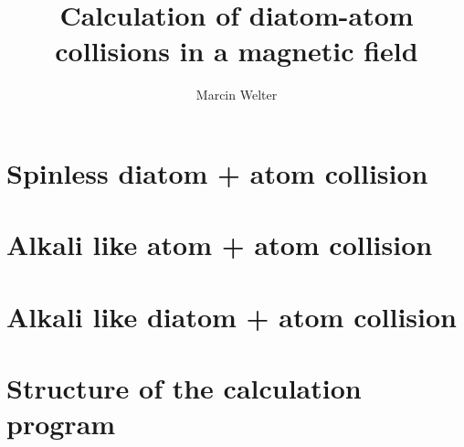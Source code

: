 \documentclass[a4paper]{article}
\title{Calculation of diatom-atom collisions in a magnetic field}
\author{Marcin Welter}
\begin{document}
\maketitle

\section{Spinless diatom + atom collision}

\section{Alkali like atom + atom collision}

\section{Alkali like diatom + atom collision}

\section{Structure of the calculation program}
\end{document}
